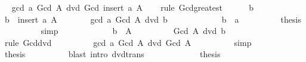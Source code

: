 \begin{isabellebody}
\ \isamarkupfalse%
\ {\isachardoublequoteopen}gcd\ a\ {\isacharparenleft}{\kern0pt}Gcd\ A{\isacharparenright}{\kern0pt}\ dvd\ Gcd\ {\isacharparenleft}{\kern0pt}insert\ a\ A{\isacharparenright}{\kern0pt}{\isachardoublequoteclose}\isanewline
\ \ \isamarkupfalse%
\ {\isacharparenleft}{\kern0pt}rule\ Gcd{\isacharunderscore}{\kern0pt}greatest{\isacharparenright}{\kern0pt}\isanewline
\ \ \ \ \isamarkupfalse%
\ b\isanewline
\ \ \ \ \isamarkupfalse%
\ {\isachardoublequoteopen}b\ {\isasymin}\ insert\ a\ A{\isachardoublequoteclose}\isanewline
\ \ \ \ \isamarkupfalse%
\ \isamarkupfalse%
\ {\isachardoublequoteopen}gcd\ a\ {\isacharparenleft}{\kern0pt}Gcd\ A{\isacharparenright}{\kern0pt}\ dvd\ b{\isachardoublequoteclose}\isanewline
\ \ \ \ \isamarkupfalse%
\isanewline
\ \ \ \ \ \ \isamarkupfalse%
\ {\isachardoublequoteopen}b\ {\isacharequal}{\kern0pt}\ a{\isachardoublequoteclose}\isanewline
\ \ \ \ \ \ \isamarkupfalse%
\ \isamarkupfalse%
\ {\isacharquery}{\kern0pt}thesis\isanewline
\ \ \ \ \ \ \ \ \isamarkupfalse%
\ simp\isanewline
\ \ \ \ \isamarkupfalse%
\isanewline
\ \ \ \ \ \ \isamarkupfalse%
\ {\isachardoublequoteopen}b\ {\isasymin}\ A{\isachardoublequoteclose}\isanewline
\ \ \ \ \ \ \isamarkupfalse%
\ \isamarkupfalse%
\ {\isachardoublequoteopen}Gcd\ A\ dvd\ b{\isachardoublequoteclose}\isanewline
\ \ \ \ \ \ \ \ \isamarkupfalse%
\ {\isacharparenleft}{\kern0pt}rule\ Gcd{\isacharunderscore}{\kern0pt}dvd{\isacharparenright}{\kern0pt}\isanewline
\ \ \ \ \ \ \isamarkupfalse%
\ \isamarkupfalse%
\ {\isachardoublequoteopen}gcd\ a\ {\isacharparenleft}{\kern0pt}Gcd\ A{\isacharparenright}{\kern0pt}\ dvd\ Gcd\ A{\isachardoublequoteclose}\isanewline
\ \ \ \ \ \ \ \ \isamarkupfalse%
\ simp\isanewline
\ \ \ \ \ \ \isamarkupfalse%
\ \isamarkupfalse%
\ {\isacharquery}{\kern0pt}thesis\isanewline
\ \ \ \ \ \ \ \ \isamarkupfalse%
\ {\isacharparenleft}{\kern0pt}blast\ intro{\isacharcolon}{\kern0pt}\ dvd{\isacharunderscore}{\kern0pt}trans{\isacharparenright}{\kern0pt}\isanewline
\ \ \ \ \isamarkupfalse%
\isanewline
\ \ \isamarkupfalse%
\isanewline
\ \ \isamarkupfalse%
\ \isamarkupfalse%
\ {\isacharquery}{\kern0pt}thesis\isanewline
\ \ \ \ \isamarkupfalse%

\end{isabellebody}
